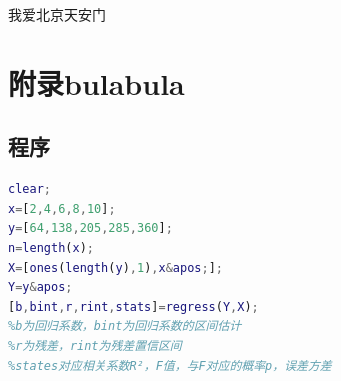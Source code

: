 \documentclass[UTF8,12pt,a4paper]{article}
\begin{document}
\begin{thebibliography}{2}
 我爱北京天安门
\end{thebibliography}


\appendix
\renewcommand{\appendixname}{Appendix~\Alph{section}}

\section{附录bulabula}
\subsection{程序}
\begin{lstlisting}[language={Matlab},morekeywords={regress}]
clear;
x=[2,4,6,8,10];
y=[64,138,205,285,360];
n=length(x);
X=[ones(length(y),1),x&apos;];
Y=y&apos;
[b,bint,r,rint,stats]=regress(Y,X);
%b为回归系数，bint为回归系数的区间估计
%r为残差，rint为残差置信区间
%states对应相关系数R²，F值，与F对应的概率p，误差方差
\end{lstlisting}
\end{document}
